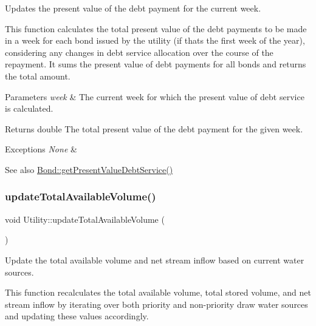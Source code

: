 Updates the present value of the debt payment for the current week. 

This function calculates the total present value of the debt payments to be made in a week for each bond issued by the utility (if that\textquotesingle{}s the first week of the year), considering any changes in debt service allocation over the course of the repayment. It sums the present value of debt payments for all bonds and returns the total amount.


\begin{DoxyParams}{Parameters}
{\em week} & The current week for which the present value of debt service is calculated. \\
\hline
\end{DoxyParams}
\begin{DoxyReturn}{Returns}
double The total present value of the debt payment for the given week. 
\end{DoxyReturn}

\begin{DoxyExceptions}{Exceptions}
{\em None} & \\
\hline
\end{DoxyExceptions}
\begin{DoxySeeAlso}{See also}
\mbox{\hyperlink{classBond_a322d4ab0c0c72824ac4df5df80f14d24}{Bond\+::get\+Present\+Value\+Debt\+Service()}} 
\end{DoxySeeAlso}
\mbox{\label{classUtility_af394fe9f04a371a7cf10ddadba575e85}} 
\subsubsection{\texorpdfstring{update\+Total\+Available\+Volume()}{updateTotalAvailableVolume()}}
{\footnotesize\ttfamily void Utility\+::update\+Total\+Available\+Volume (\begin{DoxyParamCaption}{ }\end{DoxyParamCaption})}



Update the total available volume and net stream inflow based on current water sources. 

This function recalculates the total available volume, total stored volume, and net stream inflow by iterating over both priority and non-\/priority draw water sources and updating these values accordingly.

